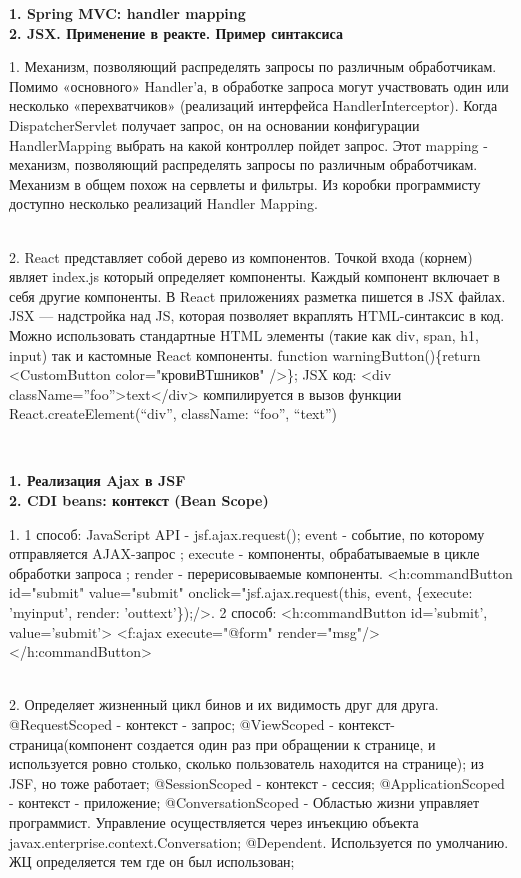 \documentclass{article}
\newcommand{\bil}[4]{%
    \begin{minipage}{.3\textwidth}
        \textbf{1. #1} \\
        \textbf{2. #2}

        1. #3
        \\
        2. #4
    \end{minipage}
}
\begin{document}
\hfill
\bil{Spring MVC: handler mapping}{JSX. Применение в реакте. Пример синтаксиса}{
    Механизм, позволяющий распределять запросы по различным обработчикам.
    Помимо «основного» Handler'а, в обработке запроса могут участвовать один или несколько «перехватчиков» (реализаций интерфейса HandlerInterceptor).
    Когда DispatcherServlet получает запрос, он на основании конфигурации HandlerMapping выбрать на какой контроллер пойдет запрос. 
    Этот mapping - механизм, позволяющий распределять запросы по различным обработчикам. Механизм в общем похож на сервлеты и
    фильтры. Из коробки программисту доступно несколько реализаций Handler Mapping.
}{
    React представляет собой дерево из компонентов. 
    Точкой входа (корнем) являет index.js который определяет компоненты. 
    Каждый компонент включает в себя другие компоненты.
    В React приложениях разметка пишется в JSX файлах. JSX — надстройка над JS, которая позволяет вкраплять HTML-синтаксис в код. 
    Можно использовать стандартные HTML элементы (такие как div, span, h1, input) так и кастомные React компоненты.
    function warningButton()\{return <CustomButton color="кровиВТшников" />\};
    JSX код: <div className=”foo”>text</div> компилируется в вызов функции React.createElement(“div”, { className: “foo”}, “text”)
}
\\
\bil{Реализация Ajax в JSF}{CDI beans: контекст (Bean Scope)}{
1 способ: JavaScript API - jsf.ajax.request(); event - событие, по которому отправляется AJAX-запрос
; execute - компоненты, обрабатываемые в цикле обработки запроса
; render - перерисовываемые компоненты.
<h:commandButton id="submit" value="submit"
onclick="jsf.ajax.request(this, event, \{execute: 'myinput', render: 'outtext'\});/>.
2 способ: 
<h:commandButton id='submit', value='submit'> <f:ajax execute="@form" render="msg"/></h:commandButton>
}{Определяет жизненный цикл бинов и их видимость друг для друга.
    @RequestScoped - контекст - запрос;
@ViewScoped - контекст-страница(компонент создается один раз при обращении к странице, и используется ровно столько, сколько пользователь находится на странице); из JSF, но тоже работает;
@SessionScoped - контекст - сессия;
@ApplicationScoped - контекст - приложение;
@ConversationScoped - Областью жизни управляет программист. Управление осуществляется через инъекцию объекта javax.enterprise.context.Conversation;
@Dependent.  Используется по умолчанию. ЖЦ определяется тем где он был использован;}
\hfill
\end{document}
